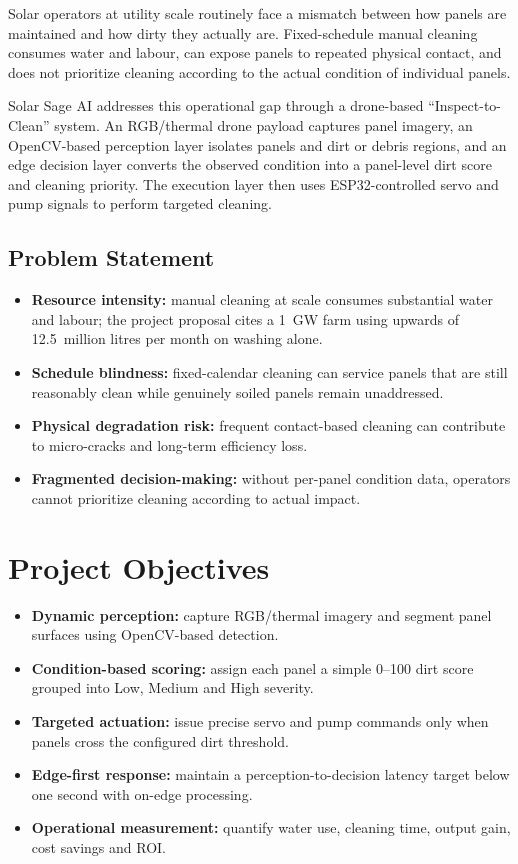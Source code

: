 \documentclass[12pt]{report}
\begin{document}
Solar operators at utility scale routinely face a mismatch between how panels are maintained and how dirty they actually are. Fixed-schedule manual cleaning consumes water and labour, can expose panels to repeated physical contact, and does not prioritize cleaning according to the actual condition of individual panels.

Solar Sage AI addresses this operational gap through a drone-based ``Inspect-to-Clean'' system. An RGB/thermal drone payload captures panel imagery, an OpenCV-based perception layer isolates panels and dirt or debris regions, and an edge decision layer converts the observed condition into a panel-level dirt score and cleaning priority. The execution layer then uses ESP32-controlled servo and pump signals to perform targeted cleaning.

\subsection{Problem Statement}

\begin{itemize}[leftmargin=*]
    \item \textbf{Resource intensity:} manual cleaning at scale consumes substantial water and labour; the project proposal cites a 1~GW farm using upwards of 12.5~million litres per month on washing alone.
    \item \textbf{Schedule blindness:} fixed-calendar cleaning can service panels that are still reasonably clean while genuinely soiled panels remain unaddressed.
    \item \textbf{Physical degradation risk:} frequent contact-based cleaning can contribute to micro-cracks and long-term efficiency loss.
    \item \textbf{Fragmented decision-making:} without per-panel condition data, operators cannot prioritize cleaning according to actual impact.
\end{itemize}

\section{Project Objectives}

\begin{itemize}[leftmargin=*]
    \item \textbf{Dynamic perception:} capture RGB/thermal imagery and segment panel surfaces using OpenCV-based detection.
    \item \textbf{Condition-based scoring:} assign each panel a simple 0--100 dirt score grouped into Low, Medium and High severity.
    \item \textbf{Targeted actuation:} issue precise servo and pump commands only when panels cross the configured dirt threshold.
    \item \textbf{Edge-first response:} maintain a perception-to-decision latency target below one second with on-edge processing.
    \item \textbf{Operational measurement:} quantify water use, cleaning time, output gain, cost savings and ROI.
\end{itemize}
\end{document}

